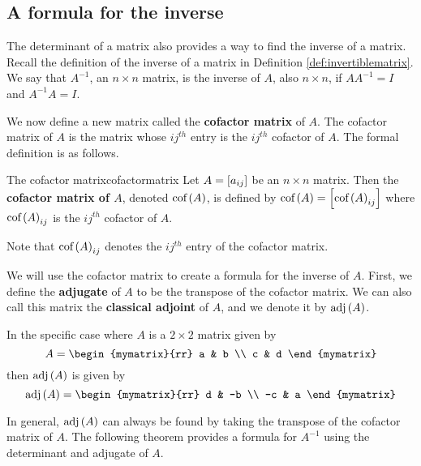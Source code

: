 \subsection{A formula for the inverse}

The determinant of a matrix also provides a way to find the inverse of a matrix.
Recall the definition of the inverse of a matrix in Definition \ref{def:invertiblematrix}.
We say that $A^{-1}$, an $n \times n$ matrix, is the inverse of $A$, also $n \times n$, if $AA^{-1} = I$ and $A^{-1}A=I$. 

We now define a new matrix called the \textbf{cofactor matrix} of $A$.  
The cofactor matrix of $A$ is the matrix whose $ij^{th}$ entry is the $ij^{th}$ cofactor of $A$.
The formal definition is as follows.

\begin{definition}{The cofactor matrix}{cofactormatrix}
Let $A=\left[a_{ij}\right]$ be an $n\times n$ matrix. Then the
\textbf{cofactor matrix of $A$}, denoted 
$\mbox{cof}\left( A\right)$, is defined by $\mbox{cof}\left( A\right) =\left[
\mbox{cof}\left(A\right)_{ij}\right] $ where  $\mbox{cof}\left(A\right)_{ij}$ is the $ij^{th}$ cofactor of $A$.
\end{definition}

Note that $\mbox{cof}\left(A\right)_{ij}$ denotes the $ij^{th}$ entry of the cofactor matrix.

We will use the cofactor matrix to create a formula for the inverse of $A$. First,
we define the \textbf{adjugate} of $A$ to be the transpose of 
the cofactor matrix. We can also call this matrix the \textbf{classical adjoint} of $A$,
and we denote it by $\mbox{adj} \left(A\right)$. 

In the specific case where $A$ is a $2 \times 2$ matrix given by
\begin{equation*}
A = \begin{mymatrix}{rr}
a & b \\
c & d
\end{mymatrix}
\end{equation*}
then $\mbox{adj}\left(A\right)$ is given by
\begin{equation*}
\func{adj}\left(A\right) = 
\begin{mymatrix}{rr}
d & -b \\
-c & a
\end{mymatrix}
\end{equation*}

In general, $\mbox{adj}\left(A\right)$ can always be found by taking the transpose of the cofactor matrix of $A$. The following theorem provides a formula for $A^{-1}$ using the determinant and adjugate of $A$.

